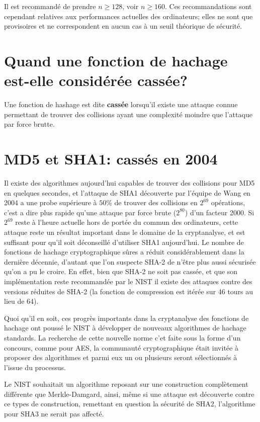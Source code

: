 \documentclass[10.5pt, a4paper, twoside, openright]{report}
\begin{document}
Il est recommandé de prendre $n \ge 128$, voir $n\ge 160$. Ces recommandations sont cependant relatives aux performances actuelles des ordinateurs; elles ne sont que provisoires et ne correspondent en aucun cas à un seuil théorique de sécurité.

\section{Quand une fonction de hachage est-elle considérée cassée?}
Une fonction de hashage est dite \textbf{cassée} lorsqu'il existe une attaque connue permettant de trouver des collisions ayant une complexité moindre que l'attaque par force brutte. 

\section{MD5 et SHA1: cassés en 2004}
Il existe des algorithmes aujourd’hui capables de trouver des collisions pour MD5 en quelques secondes, et l’attaque de SHA1 découverte par l’équipe de Wang en 2004 a une probe supérieure à $50\%$ de trouver des collisions en $2^{69}$ opérations, c’est a dire plus rapide qu’une attaque par force brute ($2^80$) d’un facteur 2000.
Si $2^{69}$ reste à l’heure actuelle hors de portée du commun des ordinateurs, cette attaque reste un résultat important dans le domaine de la cryptanalyse, et est suffisant pour qu’il soit déconseillé d’utiliser SHA1 aujourd’hui.
Le nombre de fonctions de hachage cryptographique sûres a réduit considérablement dans la dernière décennie, d’autant que l’on suspecte SHA-2 de n’être plus aussi sécurisée qu’on a pu le croire. En effet, bien que SHA-2 ne soit pas cassée, et que son implémentation reste recommandée par le NIST il existe des attaques contre des versions réduites de SHA-2 (la fonction de compression est itérée sur 46 tours au lieu de 64).

Quoi qu'il en soit, ces progrès importants dans la cryptanalyse des fonctions de hachage ont poussé le NIST à développer de nouveaux algorithmes de hachage standards. La recherche de cette nouvelle norme c'et faite sous la forme d'un concours, comme pour AES, la communauté cryptographique était invitée à proposer des algorithmes et parmi eux un ou plusieurs seront sélectionnés à l’issue du processus.

Le NIST souhaitait un algorithme reposant sur une construction complètement différente que Merkle-Damgard, ainsi, même si une attaque est découverte contre ce types de construction, remettant en question la sécurité de SHA2, l'algorithme pour SHA3 ne serait pas affecté.
 
\end{document}
